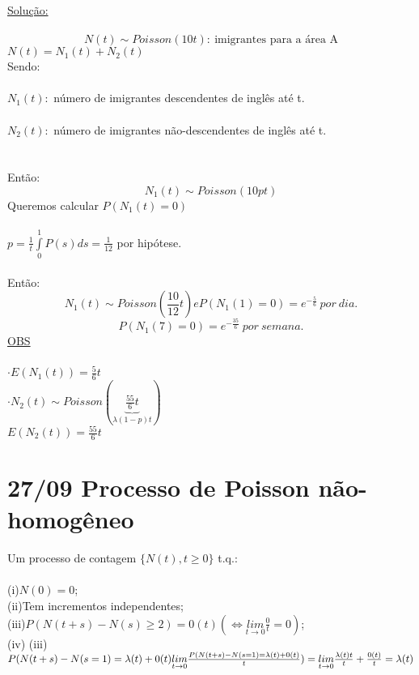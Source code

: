 \documentclass[a4paper,12pt]{article}
\begin{document}
 \underline{Solução:}\\
 \\
 $$N(t)\sim Poisson(10t):\ \text{imigrantes para a \'area A}$$
 $N(t)=N_1(t)+N_2(t)$\\
 Sendo:\\
 \\
 $N_1(t):$ número de imigrantes descendentes de inglês até t.\\
 \\
  $N_2(t):$ número de imigrantes não-descendentes de inglês até t.\\
\\
\\
Então:
$$N_1(t)\sim Poisson(10pt)$$
Queremos calcular $P(N_1(t)=0) $\\
\\
 $p=\frac{1}{t}\int\limits_{0}^{1}P(s)ds=\frac{1}{12}$ por hipótese.\\
 \\
 Então:
 $$N_1(t)\sim Poisson(\frac{10}{12}t)e P(N_1(1)=0)=e^{-\frac{5}{6}}\ por \ dia.$$
 $$P(N_1(7)=0)=e^{-\frac{35}{6}}\ por \ semana.
 $$
 \underline{OBS}\\
 \\
 $\cdot E(N_1(t))=\frac{5}{6}t $\\
 $\cdot N_2(t)\sim Poisson(\underbrace{\frac{55}{6}t}_{\lambda(1-p)t})$\\
 $E(N_2(t))=\frac{55}{6}t$
 
 \newpage
 \section*{27/09 Processo de Poisson não-homogêneo}
 Um processo de contagem   $\{N(t),t\ge0\}$ t.q.:\\
 \\
 (i)$N(0)=0$;\\
 
 (ii)Tem incrementos independentes;\\
 
 (iii)$P(N(t+s)-N(s)\ge2)=0(t)(\iff \underset{t\rightarrow0}{lim}\frac{0}{t}=0)$;\\
 
 (iv)  (iii)$P(N(t+s)-N(s=1)=\lambda(t)+0(t)\\
  \underset{t\rightarrow0}{lim}\frac{P(N(t+s)-N(s=1)=\lambda(t)+0(t)}{t})=\underset{t\rightarrow0}{lim}\frac{\lambda(t)t}{t}+\frac{0(t)}{t}=\lambda(t)$\\
  
\end{document}
